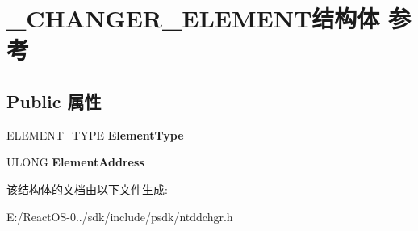 \hypertarget{struct___c_h_a_n_g_e_r___e_l_e_m_e_n_t}{}\section{\+\_\+\+C\+H\+A\+N\+G\+E\+R\+\_\+\+E\+L\+E\+M\+E\+N\+T结构体 参考}
\label{struct___c_h_a_n_g_e_r___e_l_e_m_e_n_t}
\subsection*{Public 属性}
\begin{DoxyCompactItemize}
\item 
\mbox{\label{struct___c_h_a_n_g_e_r___e_l_e_m_e_n_t_a6a9ee96a6af628a76fe8cb64f6f3f189}} 
E\+L\+E\+M\+E\+N\+T\+\_\+\+T\+Y\+PE {\bfseries Element\+Type}
\item 
\mbox{\label{struct___c_h_a_n_g_e_r___e_l_e_m_e_n_t_a40f10b016ff5973248ae865b5a097ea1}} 
U\+L\+O\+NG {\bfseries Element\+Address}
\end{DoxyCompactItemize}


该结构体的文档由以下文件生成\+:\begin{DoxyCompactItemize}
\item 
E\+:/\+React\+O\+S-\/0../sdk/include/psdk/ntddchgr.\+h\end{DoxyCompactItemize}
